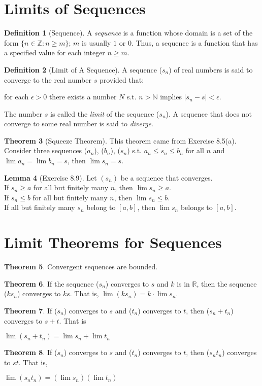 \documentclass{book}
\theoremstyle{definition}
\newtheorem{definition}{Definition}[section]
\newtheorem{theorem}[definition]{Theorem}
\newtheorem{lemma}[definition]{Lemma}
\begin{document}
\section{Limits of Sequences}
\begin{definition}[Sequence]
A \textit{sequence} is a function whose domain is a set of the form $\{n \in \mathbb{Z}: n \geq m\}$; $m$ is usually $1$ or $0$. Thus, a sequence is a function that has a specified value for each integer $n \geq m$.
\end{definition}
\begin{definition}[Limit of A Sequence]
A sequence ($s_n$) of real numbers is said to converge to the real number $s$ provided that:
\\ \begin{center} for each $\epsilon > 0$ there exists a number $N$ s.t. $n > \mathbb{N}$ implies $|s_n - s | < \epsilon$. \end{center}
The number $s$ is called the \textit{limit} of the sequence ($s_n$). A sequence that does not converge to some real number is said to \textit{diverge}.
\end{definition}
\begin{theorem}[Squeeze Theorem] This theorem came from Exercise 8.5(a).
\\ Consider three sequences ($a_n$), ($b_n$), ($s_n$) s.t. $a_n \leq s_n \leq b_n$ for all $n$ and $\lim a_n = \lim b_n = s$, then $\lim s_n = s$.
\end{theorem}
\begin{lemma}[Exercise 8.9] Let $(s_n)$ be a sequence that converges.
\\ If $s_n \geq a$ for all but finitely many $n$, then $\lim s_n \geq a$.
\\ If $s_n \leq b$ for all but finitely many $n$, then $\lim s_n \leq b$.
\\ If all but finitely many $s_n$ belong to $[a,b]$, then $\lim s_n$ belongs to $[a,b]$.
\end{lemma}
\section{Limit Theorems for Sequences}
\begin{theorem}
Convergent sequences are bounded.
\end{theorem}
\begin{theorem}
If the sequence ($s_n$) converges to $s$ and $k$ is in $\mathbb{R}$, then the sequence ($ks_n$) converges to $ks$. That is, $\lim(ks_n) = k \cdot \lim s_n$.
\end{theorem}
\begin{theorem}
If ($s_n$) converges to $s$ and ($t_n$) converges to $t$, then ($s_n + t_n$) converges to $s+t$. That is
\begin{center}
$\lim(s_n + t_n) = \lim s_n + \lim t_n$
\end{center}
\end{theorem}
\begin{theorem}
If ($s_n$) converges to $s$ and ($t_n$) converges to $t$, then ($s_n t_n$) converges to $st$. That is,
\begin{center}
$\lim(s_n t_n) = (\lim s_n)(\lim t_n)$
\end{center}
\end{theorem}
\end{document}
